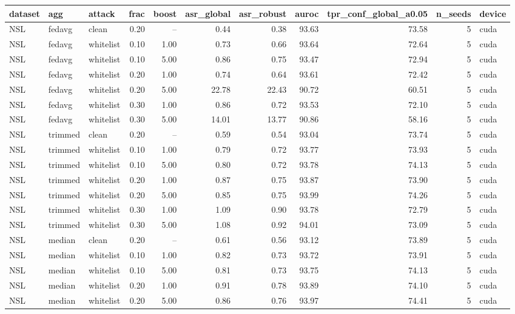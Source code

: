 \begin{tabular}{lllrrrrrrrl}
\toprule
dataset & agg & attack & frac & boost & asr\_global & asr\_robust & auroc & tpr\_conf\_global\_a0.05 & n\_seeds & device \\
\midrule
NSL & fedavg & clean & 0.20 & -- & 0.44 & 0.38 & 93.63 & 73.58 & 5 & cuda \\
NSL & fedavg & whitelist & 0.10 & 1.00 & 0.73 & 0.66 & 93.64 & 72.64 & 5 & cuda \\
NSL & fedavg & whitelist & 0.10 & 5.00 & 0.86 & 0.75 & 93.47 & 72.94 & 5 & cuda \\
NSL & fedavg & whitelist & 0.20 & 1.00 & 0.74 & 0.64 & 93.61 & 72.42 & 5 & cuda \\
NSL & fedavg & whitelist & 0.20 & 5.00 & 22.78 & 22.43 & 90.72 & 60.51 & 5 & cuda \\
NSL & fedavg & whitelist & 0.30 & 1.00 & 0.86 & 0.72 & 93.53 & 72.10 & 5 & cuda \\
NSL & fedavg & whitelist & 0.30 & 5.00 & 14.01 & 13.77 & 90.86 & 58.16 & 5 & cuda \\
NSL & trimmed & clean & 0.20 & -- & 0.59 & 0.54 & 93.04 & 73.74 & 5 & cuda \\
NSL & trimmed & whitelist & 0.10 & 1.00 & 0.79 & 0.72 & 93.77 & 73.93 & 5 & cuda \\
NSL & trimmed & whitelist & 0.10 & 5.00 & 0.80 & 0.72 & 93.78 & 74.13 & 5 & cuda \\
NSL & trimmed & whitelist & 0.20 & 1.00 & 0.87 & 0.75 & 93.87 & 73.90 & 5 & cuda \\
NSL & trimmed & whitelist & 0.20 & 5.00 & 0.85 & 0.75 & 93.99 & 74.26 & 5 & cuda \\
NSL & trimmed & whitelist & 0.30 & 1.00 & 1.09 & 0.90 & 93.78 & 72.79 & 5 & cuda \\
NSL & trimmed & whitelist & 0.30 & 5.00 & 1.08 & 0.92 & 94.01 & 73.09 & 5 & cuda \\
NSL & median & clean & 0.20 & -- & 0.61 & 0.56 & 93.12 & 73.89 & 5 & cuda \\
NSL & median & whitelist & 0.10 & 1.00 & 0.82 & 0.73 & 93.72 & 73.91 & 5 & cuda \\
NSL & median & whitelist & 0.10 & 5.00 & 0.81 & 0.73 & 93.75 & 74.13 & 5 & cuda \\
NSL & median & whitelist & 0.20 & 1.00 & 0.91 & 0.78 & 93.89 & 74.10 & 5 & cuda \\
NSL & median & whitelist & 0.20 & 5.00 & 0.86 & 0.76 & 93.97 & 74.41 & 5 & cuda \\

\end{tabular}

